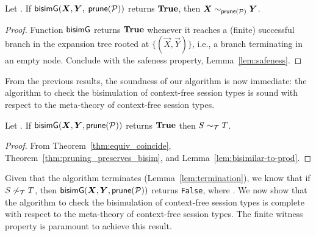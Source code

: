 \begin{lemma}
  \label{lem:bisimilar-to-prod}
  \begin{sloppypar}
  	Let \grmcontext.  If 
  $\Bisim(\vec X,\vec Y,$ $ \mathsf{prune}(\mathcal P))$ returns $\mathbf{True}$, then
  $\vec X \sim_{\Prune(\productions)} \vec Y$.
  \end{sloppypar}
\end{lemma}

\begin{proof}
  Function $\mathsf{bisimG}$ returns $\mathbf{True}$ whenever it reaches a (finite)
  successful branch in the expansion tree rooted at
  $\{(\vec X,\vec Y)\}$, i.e., a branch terminating in an empty node. 
  Conclude with the safeness property,
  Lemma~\ref{lem:safeness}.
\end{proof}

From the previous results, the soundness of our algorithm is now
immediate: the algorithm to check the bisimulation of context-free
session types is sound with respect to
the meta-theory of context-free session types.

\begin{theorem}[Soundness]
  \label{thm:soundness}
  Let \grmcontext.  If $\Bisim(\vec X,\vec Y, \Prune(\productions))$ returns $\mathbf{True}$ then
  $S\sim_\mathcal T T$.
\end{theorem}
%
\begin{proof}
  From Theorem~\ref{thm:equiv_coincide}, Theorem~\ref{thm:pruning_preserves_bisim}, 
  and Lemma~\ref{lem:bisimilar-to-prod}.
\end{proof}

 
Given that the algorithm terminates (Lemma~\ref{lem:termination}), we
know that if $S\not\sim_\mathcal T T$, then $\Bisim(\vec X, \vec Y, 
\Prune(\productions))$ returns
\lstinline|False|, where \grmcontext.
%
We now show that the algorithm to check the bisimulation of
context-free session types is complete with respect to the meta-theory
of context-free session types. The finite witness property is
paramount to achieve this result.

